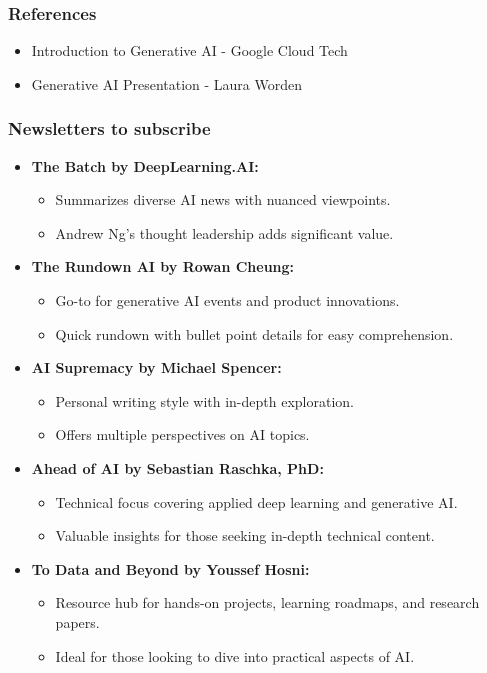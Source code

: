 
\begin{frame}\frametitle{References}
\begin{itemize}
\item Introduction to Generative AI - Google Cloud Tech
\item Generative AI Presentation - Laura Worden
\end{itemize}
\end{frame}


\begin{frame}\frametitle{Newsletters to subscribe}

\begin{itemize}
  \item \textbf{The Batch by DeepLearning.AI:}
    \begin{itemize}
      \item Summarizes diverse AI news with nuanced viewpoints.
      \item Andrew Ng's thought leadership adds significant value.
    \end{itemize}

  \item \textbf{The Rundown AI by Rowan Cheung:}
    \begin{itemize}
      \item Go-to for generative AI events and product innovations.
      \item Quick rundown with bullet point details for easy comprehension.
    \end{itemize}

  \item \textbf{AI Supremacy by Michael Spencer:}
    \begin{itemize}
      \item Personal writing style with in-depth exploration.
      \item Offers multiple perspectives on AI topics.
    \end{itemize}

  \item \textbf{Ahead of AI by Sebastian Raschka, PhD:}
    \begin{itemize}
      \item Technical focus covering applied deep learning and generative AI.
      \item Valuable insights for those seeking in-depth technical content.
    \end{itemize}

  \item \textbf{To Data and Beyond by Youssef Hosni:}
    \begin{itemize}
      \item Resource hub for hands-on projects, learning roadmaps, and research papers.
      \item Ideal for those looking to dive into practical aspects of AI.
    \end{itemize}
\end{itemize}


\end{frame}
